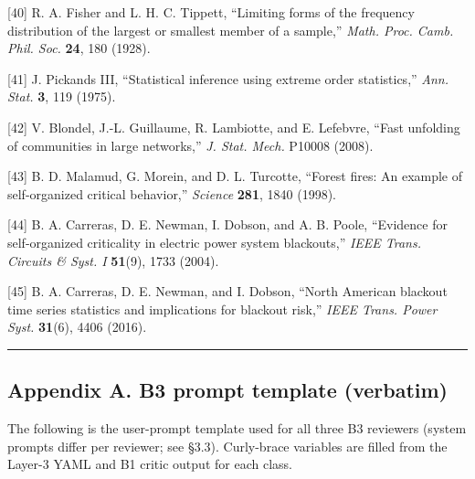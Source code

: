 \documentclass[
  letterpaper,
  11pt]{article}
\begin{document}
{[}40{]} R. A. Fisher and L. H. C. Tippett, ``Limiting forms of the
frequency distribution of the largest or smallest member of a sample,''
\emph{Math. Proc. Camb. Phil. Soc.} \textbf{24}, 180 (1928).

{[}41{]} J. Pickands III, ``Statistical inference using extreme order
statistics,'' \emph{Ann. Stat.} \textbf{3}, 119 (1975).

{[}42{]} V. Blondel, J.-L. Guillaume, R. Lambiotte, and E. Lefebvre,
``Fast unfolding of communities in large networks,'' \emph{J. Stat.
Mech.} P10008 (2008).

{[}43{]} B. D. Malamud, G. Morein, and D. L. Turcotte, ``Forest fires:
An example of self-organized critical behavior,'' \emph{Science}
\textbf{281}, 1840 (1998).

{[}44{]} B. A. Carreras, D. E. Newman, I. Dobson, and A. B. Poole,
``Evidence for self-organized criticality in electric power system
blackouts,'' \emph{IEEE Trans. Circuits \& Syst. I} \textbf{51}(9), 1733
(2004).

{[}45{]} B. A. Carreras, D. E. Newman, and I. Dobson, ``North American
blackout time series statistics and implications for blackout risk,''
\emph{IEEE Trans. Power Syst.} \textbf{31}(6), 4406 (2016).

\begin{center}\rule{0.5\linewidth}{0.5pt}\end{center}

\subsection{Appendix A. B3 prompt template
(verbatim)}\label{appendix-a.-b3-prompt-template-verbatim}

The following is the user-prompt template used for all three B3
reviewers (system prompts differ per reviewer; see §3.3). Curly-brace
variables are filled from the Layer-3 YAML and B1 critic output for each
class.
\end{document}
